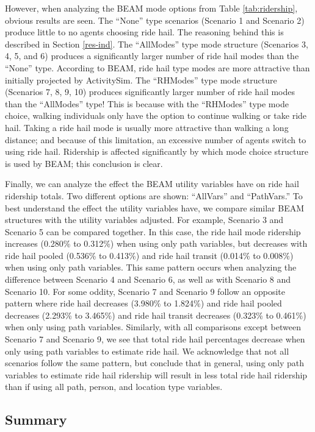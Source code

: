 \documentclass[12pt, oneside, openright]{byuthesis}
\begin{document}
However, when analyzing the BEAM mode options from Table \ref{tab:ridership}, obvious results are seen. The ``None'' type scenarios (Scenario 1 and Scenario 2) produce little to no agents choosing ride hail. The reasoning behind this is described in Section \ref{res-ind}. The ``AllModes'' type mode structure (Scenarios 3, 4, 5, and 6) produces a significantly larger number of ride hail modes than the ``None'' type. According to BEAM, ride hail type modes are more attractive than initially projected by ActivitySim. The ``RHModes'' type mode structure (Scenarios 7, 8, 9, 10) produces significantly larger number of ride hail modes than the ``AllModes'' type! This is because with the ``RHModes'' type mode choice, walking individuals only have the option to continue walking or take ride hail. Taking a ride hail mode is usually more attractive than walking a long distance; and because of this limitation, an excessive number of agents switch to using ride hail. Ridership is affected significantly by which mode choice structure is used by BEAM; this conclusion is clear.

Finally, we can analyze the effect the BEAM utility variables have on ride hail ridership totals. Two different options are shown: ``AllVars'' and ``PathVars.'' To best understand the effect the utility variables have, we compare similar BEAM structures with the utility variables adjusted. For example, Scenario 3 and Scenario 5 can be compared together. In this case, the ride hail mode ridership increases (0.280\% to 0.312\%) when using only path variables, but decreases with ride hail pooled (0.536\% to 0.413\%) and ride hail transit (0.014\% to 0.008\%) when using only path variables. This same pattern occurs when analyzing the difference between Scenario 4 and Scenario 6, as well as with Scenario 8 and Scenario 10. For some oddity, Scenario 7 and Scenario 9 follow an opposite pattern where ride hail decreases (3.980\% to 1.824\%) and ride hail pooled decreases (2.293\% to 3.465\%) and ride hail transit decreases (0.323\% to 0.461\%) when only using path variables. Similarly, with all comparisons except between Scenario 7 and Scenario 9, we see that total ride hail percentages decrease when only using path variables to estimate ride hail. We acknowledge that not all scenarios follow the same pattern, but conclude that in general, using only path variables to estimate ride hail ridership will result in less total ride hail ridership than if using all path, person, and location type variables.

\hypertarget{summary}{%
\subsection{Summary}\label{summary}}
\end{document}
